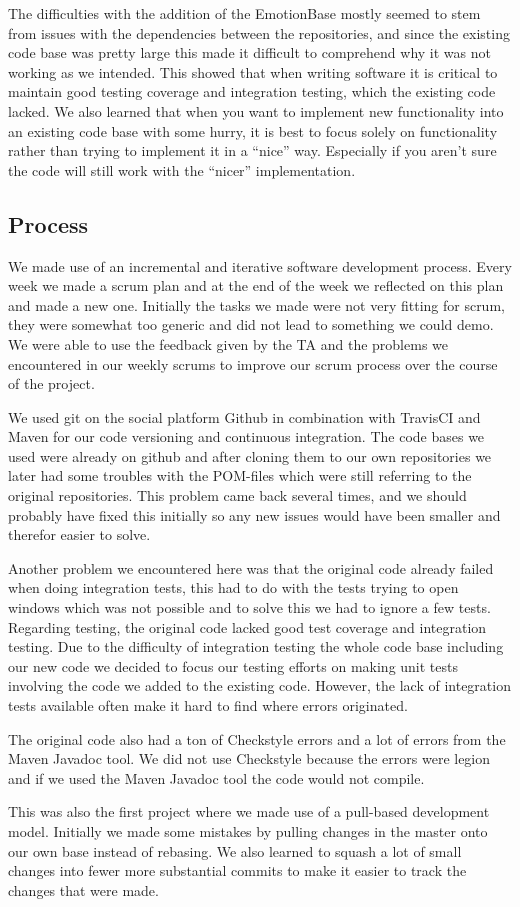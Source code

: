 \documentclass[11pt]{article}
\begin{document}
The difficulties with the addition of the EmotionBase mostly seemed to stem from issues with the dependencies between the repositories, and since the existing code base was pretty large this made it difficult to comprehend why it was not working as we intended. This showed that when writing software it is critical to maintain good testing coverage and integration testing, which the existing code lacked. We also learned that when you want to implement new functionality into an existing code base with some hurry, it is best to focus solely on functionality rather than trying to implement it in a “nice” way. Especially if you aren’t sure the code will still work with the “nicer” implementation.

\subsection{Process}
We made use of an incremental and iterative software development process. Every week we made a scrum plan and at the end of the week we reflected on this plan and made a new one. Initially the tasks we made were not very fitting for scrum, they were somewhat too generic and did not lead to something we could demo. We were able to use the feedback given by the TA and the problems we encountered in our weekly scrums to improve our scrum process over the course of the project. \par 
We used git on the social platform Github in combination with TravisCI and Maven for our code versioning and continuous integration. The code bases we used were already on github and after cloning them to our own repositories we later had some troubles with the POM-files which were still referring to the original repositories. This problem came back several times, and we should probably have fixed this initially so any new issues would have been smaller and therefor easier to solve. \par 
Another problem we encountered here was that the original code already failed when doing integration tests, this had to do with the tests trying to open windows which was not possible and to solve this we had to ignore a few tests. Regarding testing, the original code lacked good test coverage and integration testing. Due to the difficulty of integration testing the whole code base including our new code we decided to focus our testing efforts on making unit tests involving the code we added to the existing code. However, the lack of integration tests available often make it hard to find where errors originated.  \par 
The original code also had a ton of Checkstyle errors and a lot of errors from the Maven Javadoc tool. We did not use Checkstyle because the errors were legion and if we used the Maven Javadoc tool the code would not compile. \par
This was also the first project where we made use of a pull-based development model. Initially we made some mistakes by pulling changes in the master onto our own base instead of rebasing. We also learned to squash a lot of small changes into fewer more substantial commits to make it easier to track the changes that were made. 
\clearpage
\end{document}
